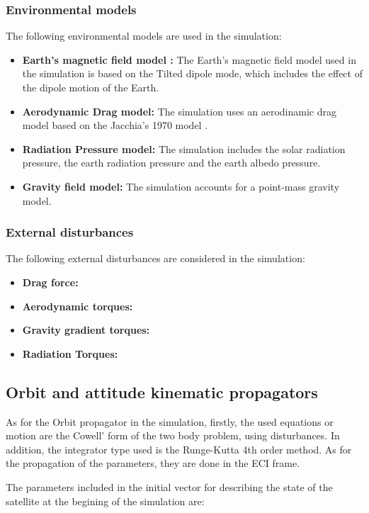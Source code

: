 \subsubsection{Environmental models}
The following environmental models are used in the simulation:
\begin{itemize}
    \item \textbf{Earth's magnetic field model \cite{Tilted_Dipole}:} The Earth's magnetic field model used in the simulation is based
    on the Tilted dipole mode, which includes the effect of the dipole motion of the Earth.
    \item \textbf{Aerodynamic Drag model:} The simulation uses an aerodinamic drag model based on the Jacchia's 1970 model
    \cite{J70_atmosphere}. 
    \item \textbf{Radiation Pressure model:} The simulation includes the solar radiation pressure, the earth radiation
    pressure and the earth albedo pressure.
    \item \textbf{Gravity field model:} The simulation accounts for a point-mass gravity model.
\end{itemize}

\subsubsection{External disturbances}
The following external disturbances are considered in the simulation:
\begin{itemize}
    \item \textbf{Drag force:} 
    \item \textbf{Aerodynamic torques:} 
    \item \textbf{Gravity gradient torques:} 
    \item \textbf{Radiation Torques:} 
\end{itemize}

\subsection{Orbit and attitude kinematic propagators}

As for the Orbit propagator in the simulation, firstly, the used equations or motion are the Cowell'
form of the two body problem, using  disturbances. In addition, the integrator type used is the Runge-Kutta 4th order method.
As for the propagation of the parameters, they are done in the ECI frame.\vspace{0.2em}

\noindent The parameters included in the initial vector for describing the state of the satellite at the begining of the simulation are:

